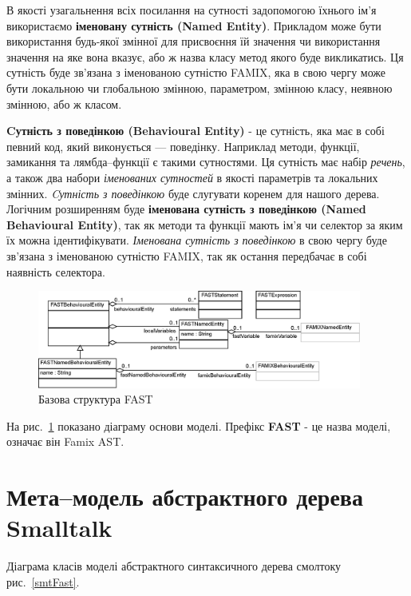 \documentclass[12pt,a4paper]{article}
\begin{document}
В якості узагальнення всіх посилання на сутності задопомогою їхнього ім'я використаємо \textbf{іменовану сутність (Named Entity)}. Прикладом може бути використання будь-якої змінної для присвоєння їй значення чи використання значення на яке вона вказує, або ж назва класу метод якого буде викликатись. Ця сутність буде зв'язана з іменованою сутністю FAMIX, яка в свою чергу може бути локальною чи глобальною змінною, параметром, змінною класу, неявною змінною, або ж класом.

\textbf{Cутність з поведінкою (Behavioural Entity)} - це сутність, яка має в собі певний код, який виконується --- поведінку. Наприклад методи, функції, замикання та лямбда--функції є такими сутностями. Ця сутність має набір \emph{речень}, а також два набори \emph{іменованих сутностей} в якості параметрів та локальних змінних. \emph{Cутність з поведінкою} буде слугувати коренем для нашого дерева. Логічним розширенням буде \textbf{іменована сутність з поведінкою (Named Behavioural Entity)}, так як методи та функції мають ім'я чи селектор за яким їх можна ідентифікувати. \emph{Іменована сутність з поведінкою} в свою чергу буде зв'язана з іменованою сутністю FAMIX, так як остання передбачає в собі наявність селектора.

\begin{figure}[h]
  \centering
    \includegraphics[width=0.95\textwidth]{GeneralASTClassDiagram}
  \caption{Базова структура FAST\label{genFast}}
\end{figure}

На рис.~\ref{genFast} показано діаграму основи моделі. Префікс \textbf{FAST} - це назва моделі, означає він Famix AST.


\clearpage

\section{Мета--модель абстрактного дерева Smalltalk}

Діаграма класів моделі абстрактного синтаксичного дерева смолтоку рис.~\ref{smtFast}.
\end{document}
